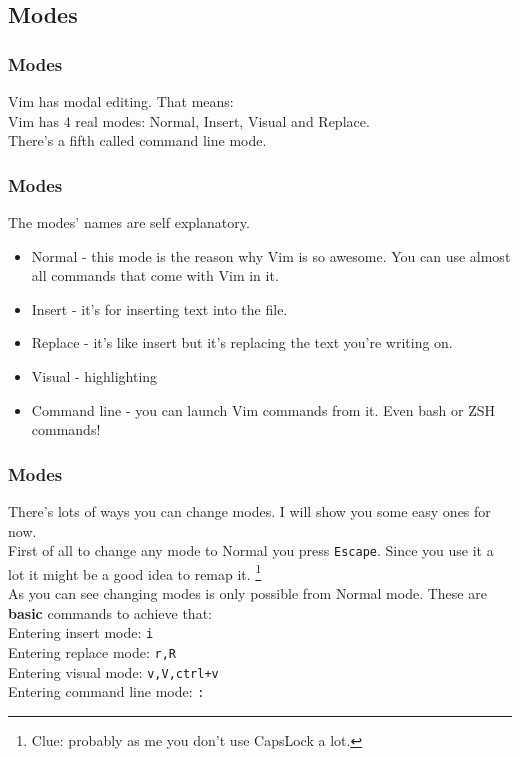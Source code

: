 \documentclass{beamer}
\begin{document}
    \subsection{Modes}
    \begin{frame}
    \frametitle{Modes}
    Vim has modal editing. That means:\\
    Vim has 4 real modes: Normal, Insert, Visual and Replace.\\
    There's a fifth called command line mode.
    \begin{center}
    \end{center}
    \end{frame}
    \begin{frame}
    \frametitle{Modes}
    The modes' names are self explanatory.
    \begin{itemize}
        \item Normal - this mode is the reason why Vim is so awesome. You can use almost
            all commands that come with Vim in it.
        \item Insert - it's for inserting text into the file.
        \item Replace - it's like insert but it's replacing the text you're writing on.
        \item Visual - highlighting
        \item Command line - you can launch Vim commands from it. Even bash or ZSH
            commands!
    \end{itemize}
    \end{frame}
    \begin{frame}
    \frametitle{Modes}
        There's lots of ways you can change modes. I will show you some easy ones for now.\\
        First of all to change any mode to Normal you press \texttt{Escape}. Since you 
        use it a lot it might be a good idea to remap it.
        \footnote{Clue: probably as me you don't use CapsLock a lot.}\\
        As you can see changing modes is only possible from Normal mode. These are 
        \textbf{basic} commands to achieve that:\\
        Entering insert mode: \texttt{i}\\
        Entering replace mode: \texttt{r,R}\\
        Entering visual mode: \texttt{v,V,ctrl+v}\\
        Entering command line mode: \texttt{:}
    \end{frame}
\end{document}
